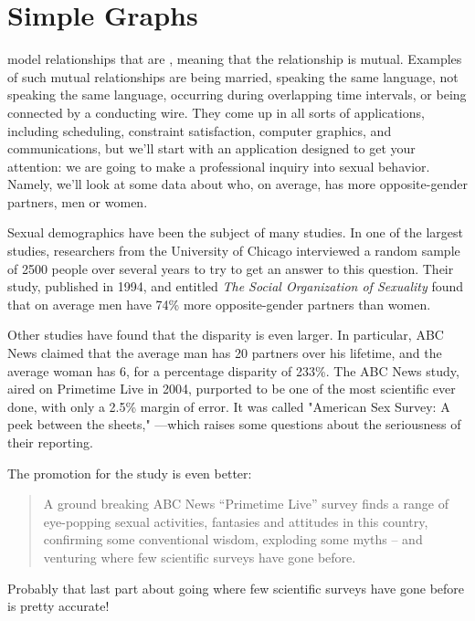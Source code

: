 \chapter{Simple Graphs}\label{simple_graphs_chap}

 model relationships that are
\emph{}, meaning that the relationship is mutual.
Examples of such mutual relationships are being married, speaking the
same language, not speaking the same language, occurring during
overlapping time intervals, or being connected by a conducting wire.
They come up in all sorts of applications, including scheduling,
constraint satisfaction, computer graphics, and communications, but
we'll start with an application designed to get your attention: we are
going to make a professional inquiry into sexual behavior.  Namely,
we'll look at some data about who, on average, has more
opposite-gender partners, men or women.

\iffalse
An example is shown in
Figure~\ref{fig:graph-example}.  The dots are called \emph{nodes} (or
\emph{vertices}) and the lines are called \emph{edges}.
\fi

Sexual demographics have been the subject of many studies.  In one of
the largest studies, researchers from the University of Chicago
interviewed a random sample of 2500 people over several years to try
to get an answer to this question.  Their study, published in 1994,
and entitled \emph{The Social Organization of Sexuality} found that on
average men have 74\% more opposite-gender partners than women.

Other studies have found that the disparity is even larger.  In
particular, ABC News claimed that the average man has 20 partners over his
lifetime, and the average woman has 6, for a percentage disparity of
233\%.  The ABC News study, aired on Primetime Live in 2004, purported to
be one of the most scientific ever done, with only a 2.5\% margin of
error.  It was called "American Sex Survey: A peek between the sheets,"
---which raises some questions about the seriousness of their reporting.
\begin{editingnotes}
The promotion for the study is even better:
\begin{quote} 
A ground breaking ABC News ``Primetime Live'' survey finds a range of
eye-popping sexual activities, fantasies and attitudes in this country,
confirming some conventional wisdom, exploding some myths -- and venturing
where few scientific surveys have gone before.
\end{quote}
Probably that last part about going where few scientific surveys have gone
before is pretty accurate!
\end{editingnotes}

